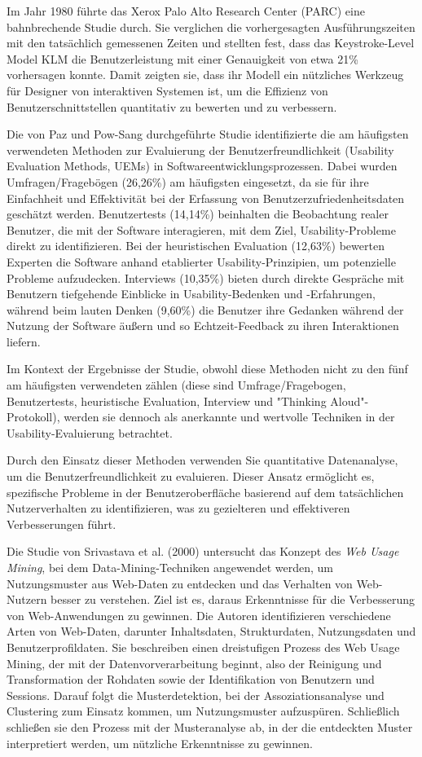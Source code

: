 \documentclass[12pt,oneside]{article}
\begin{document}
Im Jahr 1980 führte das Xerox Palo Alto Research Center (PARC)\cite{keystroke} eine bahnbrechende Studie durch. Sie verglichen die vorhergesagten Ausführungszeiten mit den tatsächlich gemessenen Zeiten und stellten fest, dass das Keystroke-Level Model  KLM die Benutzerleistung mit einer Genauigkeit von etwa 21\% vorhersagen konnte. Damit zeigten sie, dass ihr Modell ein nützliches Werkzeug für Designer von interaktiven Systemen ist, um die Effizienz von Benutzerschnittstellen quantitativ zu bewerten und zu verbessern.


Die von Paz und Pow-Sang durchgeführte Studie \cite{Paz2016} identifizierte die am häufigsten verwendeten Methoden zur Evaluierung der Benutzerfreundlichkeit (Usability Evaluation Methods, UEMs) in Softwareentwicklungsprozessen. Dabei wurden Umfragen/Fragebögen (26,26\%) am häufigsten eingesetzt, da sie für ihre Einfachheit und Effektivität bei der Erfassung von Benutzerzufriedenheitsdaten geschätzt werden. Benutzertests (14,14\%) beinhalten die Beobachtung realer Benutzer, die mit der Software interagieren, mit dem Ziel, Usability-Probleme direkt zu identifizieren. Bei der heuristischen Evaluation (12,63\%) bewerten Experten die Software anhand etablierter Usability-Prinzipien, um potenzielle Probleme aufzudecken. Interviews (10,35\%) bieten durch direkte Gespräche mit Benutzern tiefgehende Einblicke in Usability-Bedenken und -Erfahrungen, während beim lauten Denken (9,60\%) die Benutzer ihre Gedanken während der Nutzung der Software äußern und so Echtzeit-Feedback zu ihren Interaktionen liefern.

Im Kontext der Ergebnisse der Studie, obwohl diese Methoden nicht zu den fünf am häufigsten verwendeten zählen (diese sind Umfrage/Fragebogen, Benutzertests, heuristische Evaluation, Interview und "Thinking Aloud"-Protokoll), werden sie dennoch als anerkannte und wertvolle Techniken in der Usability-Evaluierung betrachtet.

Durch den Einsatz dieser Methoden verwenden Sie quantitative Datenanalyse, um die Benutzerfreundlichkeit zu evaluieren. Dieser Ansatz ermöglicht es, spezifische Probleme in der Benutzeroberfläche basierend auf dem tatsächlichen Nutzerverhalten zu identifizieren, was zu gezielteren und effektiveren Verbesserungen führt.

Die Studie von Srivastava et al. (2000)\cite{Srivastava2000} untersucht das Konzept des \textit{Web Usage Mining}, bei dem Data-Mining-Techniken angewendet werden, um Nutzungsmuster aus Web-Daten zu entdecken und das Verhalten von Web-Nutzern besser zu verstehen. Ziel ist es, daraus Erkenntnisse für die Verbesserung von Web-Anwendungen zu gewinnen. Die Autoren identifizieren verschiedene Arten von Web-Daten, darunter Inhaltsdaten, Strukturdaten, Nutzungsdaten und Benutzerprofildaten. Sie beschreiben einen dreistufigen Prozess des Web Usage Mining, der mit der Datenvorverarbeitung beginnt, also der Reinigung und Transformation der Rohdaten sowie der Identifikation von Benutzern und Sessions. Darauf folgt die Musterdetektion, bei der Assoziationsanalyse und Clustering zum Einsatz kommen, um Nutzungsmuster aufzuspüren. Schließlich schließen sie den Prozess mit der Musteranalyse ab, in der die entdeckten Muster interpretiert werden, um nützliche Erkenntnisse zu gewinnen.
\end{document}
